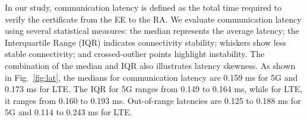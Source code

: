 In our study, communication latency is defined as the total time required to verify the certificate from the EE to the RA. We evaluate communication latency using several statistical measures: the median represents the average latency; the Interquartile Range (IQR) indicates connectivity stability; whiskers show less stable connectivity; and crossed-outlier points highlight instability. The combination of the median and IQR also illustrates latency skewness. As shown in Fig.~\ref{fig:lat}, the medians for communication latency are 0.159 ms for 5G and 0.173 ms for LTE. The IQR for 5G ranges from 0.149 to 0.164 ms, while for LTE, it ranges from 0.160 to 0.193 ms. Out-of-range latencies are 0.125 to 0.188 ms for 5G and 0.114 to 0.243 ms for LTE.